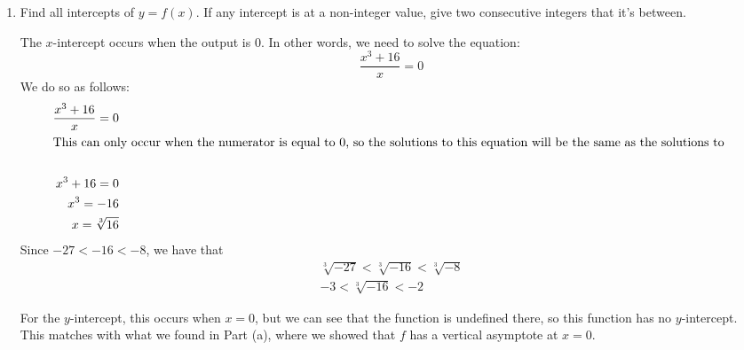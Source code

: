 \documentclass{article}
\begin{document}
\begin{enumerate}
\begin{enumerate}
    \begin{solution}
        We determine if $f$ has a horizontal asymptote by computing the limits as $x$ grows and decreases without bound (ie limits at infinity).
        \begin{itemize}
            \item $\displaystyle \lim_{x \to \infty} \dfrac{x^3 + 16}{x} = \displaystyle \lim_{x \to \infty} \dfrac{x^3}{x} = \displaystyle\lim_{x\to\infty} x^2 = \infty$
            \item $\displaystyle \lim_{x \to -\infty} \dfrac{x^3 + 16}{x} = \displaystyle \lim_{x \to -\infty} \dfrac{x^3}{x} = \displaystyle\lim_{x\to-\infty} x^2 = \infty$
        \end{itemize}
        So $f$ does not have any horizontal asymptotes.
    \end{solution}

  \item
    \begin{problem}[\vfill\newpage]
      Find all intercepts of $y = f(x)$. If any intercept is at a non-integer value, give two consecutive integers that it's between. 
    \end{problem}

    \begin{solution}
        The $x$-intercept occurs when the output is 0. In other words, we need to solve the equation:
        $$\dfrac{x^3+16}{x}= 0$$
        We do so as follows:
        \begin{align*}
            \dfrac{x^3+16}{x}= 0 \\
            \intertext{This can only occur when the numerator is equal to 0, so the solutions to this equation will be the same as the solutions to } \\
            x^3 + 16 = 0 \\
            x^3 = -16 \\
            x = \sqrt[3]{16} \\            
        \end{align*}
        Since $-27 < -16 < -8$, we have that 
        \begin{align*}
               \sqrt[3]{-27}< \sqrt[3]{-16} < \sqrt[3]{-8}\\
               -3 < \sqrt[3]{-16} < -2
        \end{align*}

    For the $y$-intercept, this occurs when $x = 0$, but we can see that the function is undefined there, so this function has no $y$-intercept. This matches with what we found in Part (a), where we showed that $f$ has a vertical asymptote at $x=0$. 
     

\end{solution}
\end{enumerate}
\end{enumerate}
\end{document}
